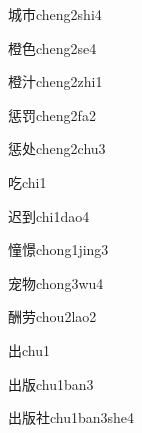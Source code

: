 \begin{verbete}[9;5]{城市}{cheng2shi4}
\end{verbete}

\begin{verbete}[16;6]{橙色}{cheng2se4}
\end{verbete}

\begin{verbete}[16;5]{橙汁}{cheng2zhi1}
\end{verbete}

\begin{verbete}[12;9]{惩罚}{cheng2fa2}
\end{verbete}

\begin{verbete}[12;5]{惩处}{cheng2chu3}
\end{verbete}

\begin{verbete}[6]{吃}{chi1}
\end{verbete}

\begin{verbete}[7;8]{迟到}{chi1dao4}
\end{verbete}

\begin{verbete}[15;15]{憧憬}{chong1jing3}
\end{verbete}

\begin{verbete}[8;8]{宠物}{chong3wu4}
\end{verbete}

\begin{verbete}[13;7]{酬劳}{chou2lao2}
\end{verbete}

\begin{verbete}[5]{出}{chu1}
\end{verbete}

\begin{verbete}[5;8]{出版}{chu1ban3}
\end{verbete}

\begin{verbete}[5;8;7]{出版社}{chu1ban3she4}
\end{verbete}

